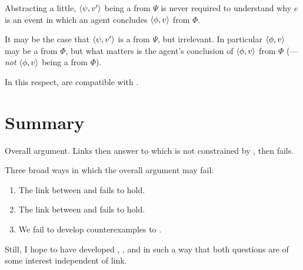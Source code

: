 \begin{note}
  Abstracting a little, \(\langle \psi, v' \rangle\) being a \fc{} from \(\Psi\) is never required to understand why \(e\) is an event in which an agent concludes \(\langle \phi, v \rangle\) from \(\Phi\).

  It may be the case that \(\langle \psi, v' \rangle\) is a \fc{} from \(\Psi\), but irrelevant.
  In particular \(\langle \phi, v \rangle\) may be a \fc{} from \(\Phi\), but what matters is the agent's conclusion of \(\langle \phi, v \rangle\) from \(\Phi\) (--- \emph{not} \(\langle \phi, v \rangle\) being a \fc{} from \(\Phi\)).

  In this respect,  are compatible with \issueConstraint{}.
\end{note}

\section*{Summary}

\begin{note}
  Overall argument.
  Links then answer to \qWhyV{} which is not constrained by \qHowV{}, then \issueInclusion{} fails.

  Three broad ways in which the overall argument may fail:
  \begin{enumerate}[label=\arabic*., ref=(\arabic*)]
  \item
    The link between \qWhyV{} and \qWhy{} fails to hold.
  \item
    The link between \qHowV{} and \qHow{} fails to hold.
  \item
    We fail to develop counterexamples to \issueConstraint{}.
  \end{enumerate}

  Still, I hope to have developed \qWhyV{}, \qHowV{}, and \issueConstraint{} in such a way that both questions are of some interest independent of link.
\end{note}







